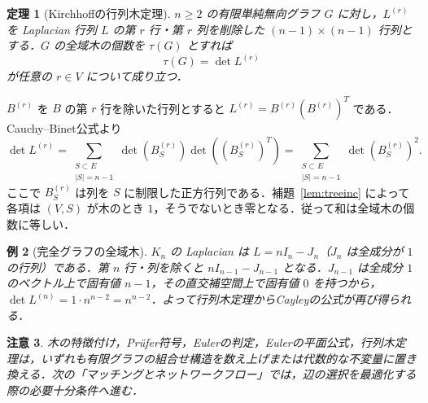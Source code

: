 \documentclass[a5paper,10pt,onecolumn]{jsarticle}
\makeatletter
\theoremstyle{mathnotetheorem}
\newtheorem{theorem}{定理}[section]
\newtheorem{example}[theorem]{例}
\newtheorem{remark}[theorem]{注意}
\renewcommand{\proofname}{証明}
\renewenvironment{proof}[1][\proofname]{%
  \par\pushQED{\qed}\normalfont\topsep4\p@\@plus2\p@\relax
  \trivlist\item[\hskip\labelsep\bfseries #1]\ignorespaces
}{\popQED\endtrivlist\@endpefalse}
\makeatother
\begin{document}
\begin{theorem}[Kirchhoffの行列木定理]\label{thm:matrix-tree}
$n\ge2$ の有限単純無向グラフ $G$ に対し，$L^{(r)}$ を Laplacian 行列 $L$ の第 $r$ 行・第 $r$ 列を削除した $(n-1)\times(n-1)$ 行列とする．$G$ の全域木の個数を $\tau(G)$ とすれば
\[
 \tau(G)=\det L^{(r)}
\]
が任意の $r\in V$ について成り立つ．
\end{theorem}
\begin{proof}
$B^{(r)}$ を $B$ の第 $r$ 行を除いた行列とすると
$L^{(r)}=B^{(r)}(B^{(r)})^T$ である．Cauchy--Binet公式より
\[
 \det L^{(r)}
 =\sum_{\substack{S\subset E\\|S|=n-1}}
 \det(B^{(r)}_S)\det((B^{(r)}_S)^T)
 =\sum_{\substack{S\subset E\\|S|=n-1}}\det(B^{(r)}_S)^2.
\]
ここで $B^{(r)}_S$ は列を $S$ に制限した正方行列である．補題~\ref{lem:treeinc} によって各項は $(V,S)$ が木のとき $1$，そうでないとき零となる．従って和は全域木の個数に等しい．
\end{proof}

\begin{example}[完全グラフの全域木]
$K_n$ の Laplacian は $L=nI_n-J_n$（$J_n$ は全成分が $1$ の行列）である．第 $n$ 行・列を除くと $nI_{n-1}-J_{n-1}$ となる．$J_{n-1}$ は全成分 $1$ のベクトル上で固有値 $n-1$，その直交補空間上で固有値 $0$ を持つから，$\det L^{(n)}=1\cdot n^{n-2}=n^{n-2}$．よって行列木定理からCayleyの公式が再び得られる．
\end{example}

\begin{remark}
木の特徴付け，Pr\"ufer符号，Eulerの判定，Eulerの平面公式，行列木定理は，いずれも有限グラフの組合せ構造を数え上げまたは代数的な不変量に置き換える．次の「マッチングとネットワークフロー」では，辺の選択を最適化する際の必要十分条件へ進む．
\end{remark}
\end{document}
